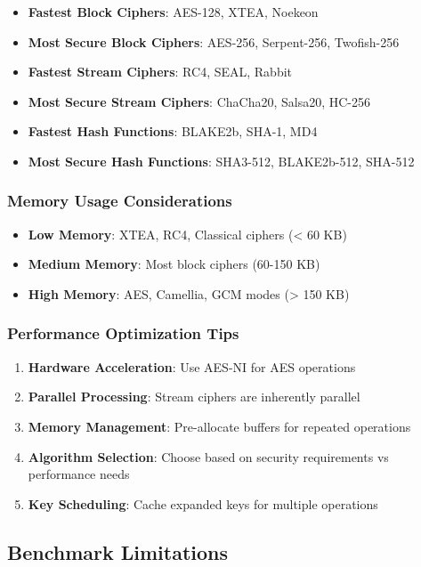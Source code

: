 \documentclass[12pt,a4paper]{article}
\begin{document}
\begin{itemize}
    \item \textbf{Fastest Block Ciphers}: AES-128, XTEA, Noekeon
    \item \textbf{Most Secure Block Ciphers}: AES-256, Serpent-256, Twofish-256
    \item \textbf{Fastest Stream Ciphers}: RC4, SEAL, Rabbit
    \item \textbf{Most Secure Stream Ciphers}: ChaCha20, Salsa20, HC-256
    \item \textbf{Fastest Hash Functions}: BLAKE2b, SHA-1, MD4
    \item \textbf{Most Secure Hash Functions}: SHA3-512, BLAKE2b-512, SHA-512
\end{itemize}

\subsubsection{Memory Usage Considerations}

\begin{itemize}
    \item \textbf{Low Memory}: XTEA, RC4, Classical ciphers (< 60 KB)
    \item \textbf{Medium Memory}: Most block ciphers (60-150 KB)
    \item \textbf{High Memory}: AES, Camellia, GCM modes (> 150 KB)
\end{itemize}

\subsubsection{Performance Optimization Tips}

\begin{enumerate}
    \item \textbf{Hardware Acceleration}: Use AES-NI for AES operations
    \item \textbf{Parallel Processing}: Stream ciphers are inherently parallel
    \item \textbf{Memory Management}: Pre-allocate buffers for repeated operations
    \item \textbf{Algorithm Selection}: Choose based on security requirements vs performance needs
    \item \textbf{Key Scheduling}: Cache expanded keys for multiple operations
\end{enumerate}

\subsection{Benchmark Limitations}
\end{document}
